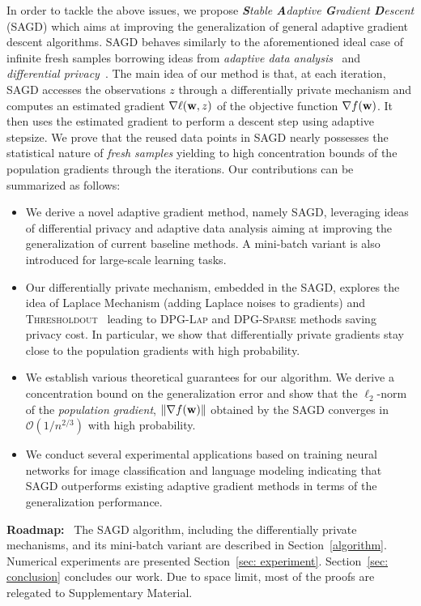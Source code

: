 \documentclass[11pt]{article}
\begin{document}
In order to tackle the above issues, we propose \textit{\textbf{S}table \textbf{A}daptive \textbf{G}radient \textbf{D}escent} (\textsc{SAGD}) which aims at improving the generalization of general adaptive gradient descent algorithms.
\textsc{SAGD} behaves similarly to the aforementioned ideal case of infinite fresh samples borrowing ideas from \emph{adaptive data analysis}~\citep{dwfe15} and \emph{differential privacy}~\citep{dwro2014}. 
The main idea of our method is that, at each iteration, \textsc{SAGD} accesses the observations $z$ through a differentially private mechanism and computes an estimated gradient $\nabla \ell(\mathbf{w},z)$ of the objective function $\nabla f(\mathbf{w})$. 
It then uses the estimated gradient to perform a descent step using adaptive stepsize. 
We prove that the reused data points in \textsc{SAGD} nearly possesses the statistical nature of \emph{fresh samples} yielding to high concentration bounds of the population gradients through the iterations. Our  contributions  can be summarized as follows:
\begin{itemize}
\item We derive a novel adaptive gradient method, namely \textsc{SAGD}, leveraging ideas of differential privacy and adaptive data analysis aiming at improving the generalization of current baseline methods. A mini-batch variant is also introduced for large-scale learning tasks.
\item Our differentially private mechanism, embedded in the \textsc{SAGD}, explores the idea of Laplace Mechanism (adding Laplace noises to gradients) and \textsc{Thresholdout}~\citep{dwro2014} leading to \textsc{DPG-Lap} and \textsc{DPG-Sparse} methods saving privacy cost. 
In particular, we show that differentially private gradients stay close to the population gradients with high probability. 
\item We establish various theoretical guarantees for our algorithm. We derive a concentration bound on the generalization error and show that the $\ell_2$-norm of the \emph{population gradient}, \ie $\|\nabla f(\mathbf{w})\|$ obtained by the \textsc{SAGD} converges in $\mathcal{O}(1/n^{2/3})$ with high probability. 
\item We conduct several experimental applications based on training neural networks for image classification and language modeling indicating that \textsc{SAGD} outperforms existing adaptive gradient methods in terms of the generalization performance.
\end{itemize}
\textbf{Roadmap:} \ 
The \textsc{SAGD} algorithm, including the differentially private mechanisms, and its mini-batch variant are described in Section~\ref{algorithm}. 
Numerical experiments are presented Section~\ref{sec: experiment}. 
Section~\ref{sec: conclusion} concludes our work. 
Due to space limit, most of the proofs are relegated to Supplementary Material.
\end{document}
